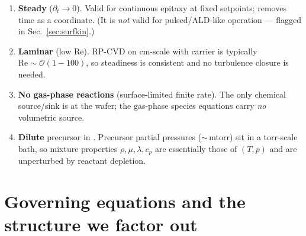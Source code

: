 \documentclass[11pt]{article}
\newcommand{\Rey}{\mathrm{Re}}
\begin{document}
\begin{enumerate}[leftmargin=1.4em,itemsep=2pt]
\item \textbf{Steady} ($\partial_t \to 0$). Valid for continuous epitaxy at fixed setpoints; removes time as a coordinate. (It is \emph{not} valid for pulsed/ALD-like operation --- flagged in Sec.~\ref{sec:surfkin}.)
\item \textbf{Laminar} (low $\Rey$). RP-CVD on cm-scale with  carrier is typically $\Rey\!\sim\!\mathcal{O}(1\!-\!100)$, so steadiness is consistent and no turbulence closure is needed.
\item \textbf{No gas-phase reactions} (surface-limited finite rate). The only chemical source/sink is at the wafer; the gas-phase species equations carry \emph{no} volumetric source.
\item \textbf{Dilute} precursor in . Precursor partial pressures ($\sim$\,mtorr) sit in a torr-scale  bath, so mixture properties $\rho,\mu,\lambda,c_p$ are essentially those of $(T,p)$ and are unperturbed by reactant depletion.
\end{enumerate}

\section{Governing equations and the structure we factor out}
\label{sec:eqns}
\end{document}

